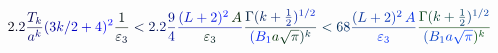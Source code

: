 \documentclass[12pt]{article}
\begin{document}
\makeatletter
\renewcommand*{\@textcolor}[3]{%
  \protect\leavevmode
  \begingroup
    \color#1{#2}#3%
  \endgroup
}
\makeatother
\begin{displaymath}
\mathcolor[RGB]{0,0,15}{2} \mathcolor[RGB]{0,0,30}{.} \mathcolor[RGB]{0,0,45}{2} \mathcolor[RGB]{0,0,60}{\frac { \mathcolor[RGB]{0,0,75}{T} _ { \mathcolor[RGB]{0,0,90}{k} } } { \mathcolor[RGB]{0,0,105}{a} ^ { \mathcolor[RGB]{0,0,120}{k} } } } \mathcolor[RGB]{0,0,135}{(} \mathcolor[RGB]{0,0,150}{3} \mathcolor[RGB]{0,0,165}{k} \mathcolor[RGB]{0,0,180}{/} \mathcolor[RGB]{0,0,195}{2} \mathcolor[RGB]{0,0,210}{+} \mathcolor[RGB]{0,0,225}{4} \mathcolor[RGB]{0,0,240}{)} ^ { \mathcolor[RGB]{0,0,255}{2} } \mathcolor[RGB]{0,15,0}{\frac { \mathcolor[RGB]{0,15,15}{1} } { \mathcolor[RGB]{0,15,30}{\varepsilon} _ { \mathcolor[RGB]{0,15,45}{3} } } } \mathcolor[RGB]{0,15,60}{<} \mathcolor[RGB]{0,15,75}{2} \mathcolor[RGB]{0,15,90}{.} \mathcolor[RGB]{0,15,105}{2} \mathcolor[RGB]{0,15,120}{\frac { \mathcolor[RGB]{0,15,135}{9} } { \mathcolor[RGB]{0,15,150}{4} } } \mathcolor[RGB]{0,15,165}{\frac { \mathcolor[RGB]{0,15,180}{(} \mathcolor[RGB]{0,15,195}{L} \mathcolor[RGB]{0,15,210}{+} \mathcolor[RGB]{0,15,225}{2} \mathcolor[RGB]{0,15,240}{)} ^ { \mathcolor[RGB]{0,15,255}{2} } \, \mathcolor[RGB]{0,30,0}{A} } { \mathcolor[RGB]{0,30,15}{\varepsilon} _ { \mathcolor[RGB]{0,30,30}{3} } } } \mathcolor[RGB]{0,30,45}{\frac { \mathcolor[RGB]{0,30,60}{\Gamma} \mathcolor[RGB]{0,30,75}{(} \mathcolor[RGB]{0,30,90}{k} \mathcolor[RGB]{0,30,105}{+} \mathcolor[RGB]{0,30,120}{\frac { \mathcolor[RGB]{0,30,135}{1} } { \mathcolor[RGB]{0,30,150}{2} } } \mathcolor[RGB]{0,30,165}{)} ^ { \mathcolor[RGB]{0,30,180}{1} \mathcolor[RGB]{0,30,195}{/} \mathcolor[RGB]{0,30,210}{2} } } { \mathcolor[RGB]{0,30,225}{(} \mathcolor[RGB]{0,30,240}{B} _ { \mathcolor[RGB]{0,30,255}{1} } \mathcolor[RGB]{0,45,0}{a} \mathcolor[RGB]{0,45,15}{\sqrt { \mathcolor[RGB]{0,45,30}{\pi} } } \mathcolor[RGB]{0,45,45}{)} ^ { \mathcolor[RGB]{0,45,60}{k} } } } \mathcolor[RGB]{0,45,75}{<} \mathcolor[RGB]{0,45,90}{6} \mathcolor[RGB]{0,45,105}{8} \mathcolor[RGB]{0,45,120}{\frac { \mathcolor[RGB]{0,45,135}{(} \mathcolor[RGB]{0,45,150}{L} \mathcolor[RGB]{0,45,165}{+} \mathcolor[RGB]{0,45,180}{2} \mathcolor[RGB]{0,45,195}{)} ^ { \mathcolor[RGB]{0,45,210}{2} } \, \mathcolor[RGB]{0,45,225}{A} } { \mathcolor[RGB]{0,45,240}{\varepsilon} _ { \mathcolor[RGB]{0,45,255}{3} } } } \mathcolor[RGB]{0,60,0}{\frac { \mathcolor[RGB]{0,60,15}{\Gamma} \mathcolor[RGB]{0,60,30}{(} \mathcolor[RGB]{0,60,45}{k} \mathcolor[RGB]{0,60,60}{+} \mathcolor[RGB]{0,60,75}{\frac { \mathcolor[RGB]{0,60,90}{1} } { \mathcolor[RGB]{0,60,105}{2} } } \mathcolor[RGB]{0,60,120}{)} ^ { \mathcolor[RGB]{0,60,135}{1} \mathcolor[RGB]{0,60,150}{/} \mathcolor[RGB]{0,60,165}{2} } } { \mathcolor[RGB]{0,60,180}{(} \mathcolor[RGB]{0,60,195}{B} _ { \mathcolor[RGB]{0,60,210}{1} } \mathcolor[RGB]{0,60,225}{a} \mathcolor[RGB]{0,60,240}{\sqrt { \mathcolor[RGB]{0,60,255}{\pi} } } \mathcolor[RGB]{0,75,0}{)} ^ { \mathcolor[RGB]{0,75,15}{k} } } }
\end{displaymath}
\end{document}
